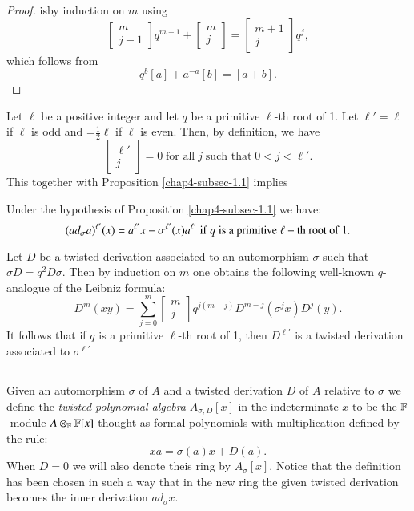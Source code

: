 \begin{proof}
is\pageoriginale by induction on $m$ using
$$
\begin{bmatrix}
m\\
j-1
\end{bmatrix}
q^{m+1} + 
\begin{bmatrix}
m\\
j
\end{bmatrix}
=
\begin{bmatrix}
m+1\\
j
\end{bmatrix}
q^{j},
$$
which follows from
$$
q^{b}[a]+ a^{-a}[b] = [a+b].
$$
\end{proof}

Let $\ell$ be a positive integer and let $q$ be a primitive $\ell$-th root of 1. Let $\ell' = \ell$ if $\ell$ is odd  and =$\frac{1}{2}\ell$ if $\ell$ is even. Then, by definition, we have
$$
\begin{bmatrix}
\ell'\\
j
\end{bmatrix}  
=0\; \text{for all}\; j\; \text{such that} \;0 < j < \ell'.
$$
This together with Proposition \ref{chap4-subsec-1.1} implies

\begin{coro*}
Under the hypothesis of Proposition \ref{chap4-subsec-1.1} we have:
$$
(ad_{\sigma}a)^{\ell'}(x)= a^{\ell'}x-\sigma^{\ell'}(x)a^{\ell'}\; \text{\rm if}\; q\; \text{\rm is a primitive}\; \ell-\text{\rm th root of}\; 1.
$$ 
\end{coro*}

\begin{remark*}
Let $D$ be a twisted derivation associated to an automorphism $\sigma$ such that $\sigma D=q^{2}D\sigma$. Then by induction on $m$ one obtains the following well-known $q$-analogue of the Leibniz formula:
$$
D^{m}(xy) =\sum\limits_{j=0}^{m}
\begin{bmatrix}
m\\
j
\end{bmatrix}
q^{j(m-j)}D^{m-j}(\sigma^{j}x)D^{j}(y).
$$
It follows that if $q$  is  a primitive $\ell$-th root of 1, then $D^{\ell'}$ is a twisted derivation associated to $\sigma^{\ell'}$
 \end{remark*}

\subsection{}
Given an automorphism $\sigma$ of $A$ and a twisted derivation $D$ of $A$ relative to $\sigma$ we define the \textit{twisted polynomial algebra} $A_{\sigma, D}[x]$ in the indeterminate $x$ to be the $\mathbb{F}$-module $A\otimes_{\mathbb{F}}\mathbb{F}[x]$
thought as formal polynomials with multiplication defined by the rule:\label{chap4-subsec-1.2}
$$
xa = \sigma(a)x+ D(a).
$$
When $D=0$ we will also denote theis ring by $A_{\sigma}[x]$. Notice that the definition has been chosen in such a way that in the new ring the given twisted derivation becomes the inner derivation $ad_{\sigma}x$. 

